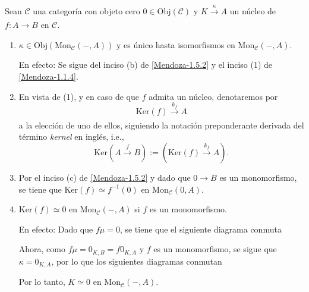\documentclass[tesis]{subfiles}
\begin{document}
\begin{Obs}\label{Mendoza-1.5.3}
    
    Sean $\mathscr{C}$ una categoría con objeto cero $0\in\text{Obj}(\mathscr{C})$ y $K\xrightarrow[]{\kappa} A$ un núcleo de $f:A\to B$ en $\mathscr{C}$.

    \begin{enumerate}[label=(\arabic*)]
    
        \item $\kappa\in\text{Obj}(\text{Mon}_\mathscr{C}(-,A))$ y es único hasta isomorfismos en $\text{Mon}_\mathscr{C}(-,A)$.

            En efecto: Se sigue del inciso (b) de \ref{Mendoza-1.5.2} y el inciso (1) de \ref{Mendoza-1.1.4}.

        \item En vista de (1), y en caso de que $f$ admita un núcleo, denotaremos por
            \[
                \text{Ker}(f)\xrightarrow[]{k_f}A
            \] 
            a la elección de uno de ellos, siguiendo la notación preponderante derivada del término \emph{kernel} en inglés, i.e.,
            \[
                \text{Ker}(A\xrightarrow[]{f}B) := (\text{Ker}(f)\xrightarrow[]{k_f}A).
            \] 
            
        \item Por el inciso (c) de \ref{Mendoza-1.5.2} y dado que $0\to B$ es un monomorfismo, se tiene que $\text{Ker}(f)\simeq f^{-1}(0)$ en $\text{Mon}_\mathscr{C}(0,A)$.

        \item $\text{Ker}(f)\simeq 0$ en $\text{Mon}_\mathscr{C}(-,A)$ si $f$ es un monomorfismo.

            En efecto: Dado que $f\mu=0$, se tiene que el siguiente diagrama conmuta
            \begin{center}
            \end{center}
            Ahora, como $f\mu=0_{K,B} = f0_{K,A}$ y $f$ es un monomorfismo, se sigue que $\kappa=0_{K,A}$, por lo que los siguientes diagramas conmutan
            \begin{center}
            \end{center}
            Por lo tanto, $K\simeq 0$ en $\text{Mon}_\mathscr{C}(-,A)$.
    \end{enumerate}
\end{Obs}
\end{document}
